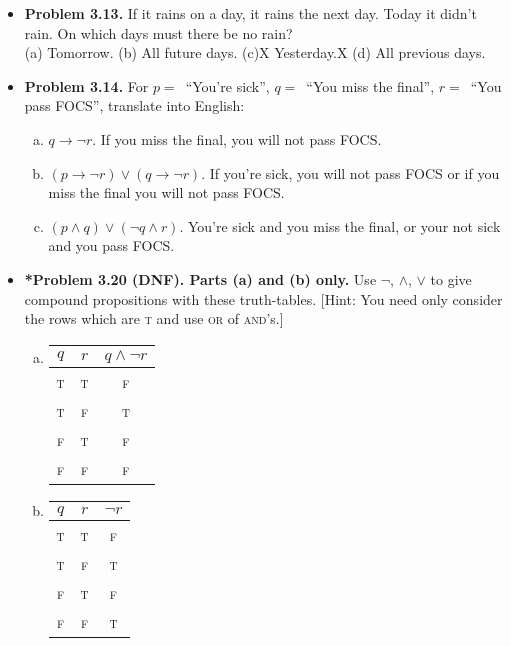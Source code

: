 \documentclass[11pt]{article}
\def\OR{\vee}
\def\AND{\wedge}
\def\imp{\rightarrow}
\begin{document}
\begin{itemize}
\item \textbf{Problem 3.13.}
  If it rains on a day, it rains the next day.
  Today it didn't rain.
  On which days must there be no rain? \\
  (a) Tomorrow.
  (b) All future days.
  (c)X Yesterday.X
  (d) All previous days.

\vspace{0.1in}

\item \textbf{Problem 3.14.}
  For $p=$~``You're sick'', $q=$~``You miss the final'',
  $r=$~``You pass FOCS'', translate into English:
  \begin{enumerate}[(a)]
  \item $q\imp\neg r$. If you miss the final, you will not pass FOCS.
  \item $(p\imp\neg r)\OR(q\imp\neg r)$. If you're sick, you will not pass FOCS or if you miss the final you will not pass FOCS.
  \item $(p\AND q)\OR(\neg q\AND r)$. You're sick and you miss the final, or your not sick and you pass FOCS.
  \end{enumerate}

\newpage

\item \textbf{*Problem 3.20 (DNF). Parts (a) and (b) only.}
  Use $\neg$, $\AND$, $\OR$ to give compound propositions with these truth-tables.
  [Hint: You need only consider the rows which are \textsc{t}
  and use \textsc{or} of \textsc{and}'s.]
  \begin{multicols}{2}
  \begin{enumerate}[(a)]
  \item
    \begin{tabular}{cc|c}
      $q$&$r$&$q \AND  \neg r$\\
      \hline
      \textsc{t}&\textsc{t}&\textsc{f}\\
      \textsc{t}&\textsc{f}&\textsc{t}\\
      \textsc{f}&\textsc{t}&\textsc{f}\\
      \textsc{f}&\textsc{f}&\textsc{f}\\
    \end{tabular}
  \item
    \begin{tabular}{cc|c}
      $q$&$r$&$\neg r$\\
      \hline
      \textsc{t}&\textsc{t}&\textsc{f}\\
      \textsc{t}&\textsc{f}&\textsc{t}\\
      \textsc{f}&\textsc{t}&\textsc{f}\\
      \textsc{f}&\textsc{f}&\textsc{t}\\
    \end{tabular}
  \end{enumerate}
  \end{multicols}


\end{itemize}
\end{document}
